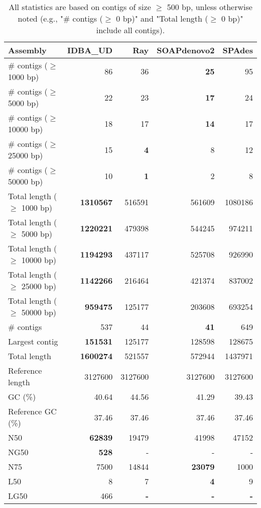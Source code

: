\documentclass[12pt,a4paper]{article}
\begin{document}
\begin{table}[ht]
\begin{center}
\caption{All statistics are based on contigs of size $\geq$ 500 bp, unless otherwise noted (e.g., "\# contigs ($\geq$ 0 bp)" and "Total length ($\geq$ 0 bp)" include all contigs).}
\begin{tabular}{|l*{4}{|r}|}
\hline
Assembly & IDBA\_UD & Ray & SOAPdenovo2 & SPAdes \\ \hline
\# contigs ($\geq$ 1000 bp) & 86 & 36 & {\bf 25} & 95 \\ \hline
\# contigs ($\geq$ 5000 bp) & 22 & 23 & {\bf 17} & 24 \\ \hline
\# contigs ($\geq$ 10000 bp) & 18 & 17 & {\bf 14} & 17 \\ \hline
\# contigs ($\geq$ 25000 bp) & 15 & {\bf 4} & 8 & 12 \\ \hline
\# contigs ($\geq$ 50000 bp) & 10 & {\bf 1} & 2 & 8 \\ \hline
Total length ($\geq$ 1000 bp) & {\bf 1310567} & 516591 & 561609 & 1080186 \\ \hline
Total length ($\geq$ 5000 bp) & {\bf 1220221} & 479398 & 544245 & 974211 \\ \hline
Total length ($\geq$ 10000 bp) & {\bf 1194293} & 437117 & 525708 & 926990 \\ \hline
Total length ($\geq$ 25000 bp) & {\bf 1142266} & 216464 & 421374 & 837002 \\ \hline
Total length ($\geq$ 50000 bp) & {\bf 959475} & 125177 & 203608 & 693254 \\ \hline
\# contigs & 537 & 44 & {\bf 41} & 649 \\ \hline
Largest contig & {\bf 151531} & 125177 & 128598 & 128675 \\ \hline
Total length & {\bf 1600274} & 521557 & 572944 & 1437971 \\ \hline
Reference length & 3127600 & 3127600 & 3127600 & 3127600 \\ \hline
GC (\%) & 40.64 & 44.56 & 41.29 & 39.43 \\ \hline
Reference GC (\%) & 37.46 & 37.46 & 37.46 & 37.46 \\ \hline
N50 & {\bf 62839} & 19479 & 41998 & 47152 \\ \hline
NG50 & {\bf 528} & - & - & - \\ \hline
N75 & 7500 & 14844 & {\bf 23079} & 1000 \\ \hline
L50 & 8 & 7 & {\bf 4} & 9 \\ \hline
LG50 & 466 & {\bf -} & {\bf -} & {\bf -} \\ \hline

\end{tabular}
\end{center}
\end{table}
\end{document}
